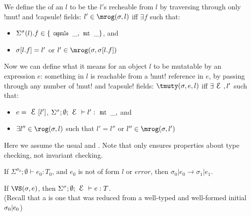\begin{Assumption}
We define the \mrog of an $l$ to be the $l'$s recheable from $l$ by traversing through only \Q!mut! and \Q!capsule! fields:
\indent $l' \in \mrog(\s, l)$ iff $\exists f$ such that:
\SS[0.25]\begin{itemize}
	\item $\S(l).f \in \{\Kw{capsule}\,\_, \Kw{mut}\,\_\}$, and
	\item $\sigma[l.f] = l'$ or $l' \in \mrog(\s, \s[l.f])$
\end{itemize}

\noindent Now we can define what it means for an object $l$ to be mutatable by an expression $e$: something in $l$ is reachable from a \Q!mut! reference in $e$, by passing through any number of \Q!mut! and \Q!capsule! fields:
\SS[0.25]\indent $\tmuty(\s, e, l)$ iff $\exists \E,l'$ such that:
\begin{itemize}
	\item $e = \E[l']$, $\tyr{l'}{\Kw{mut}\,\_,}$ and
	\item $\exists l'' \in \rog(\s, l)$ such that $l' = l''$ or $l'' \in \mrog(\s, l')$
\end{itemize}

Here we assume the usual  and . Note that  only ensures properties about type checking, not invariant checking.
\begin{Assumption}[Progress]\rm
	If $\Sigma^{\sigma_0};\emptyset\vdash e_0: T_0$,
	and $e_0$ is not of form $l$ or $\mathit{error}$, then
	$\sigma_0|e_0\rightarrow \sigma_1|e_1$.
\end{Assumption}

\begin{Assumption}\rm
	If $\VS(\s, e)$, then $\tyr{e}{T}$.\\
(Recall that a \VS is one that was reduced from a well-typed and well-formed initial $\sigma_0|e_0$)
\end{Assumption}


\end{Assumption}
